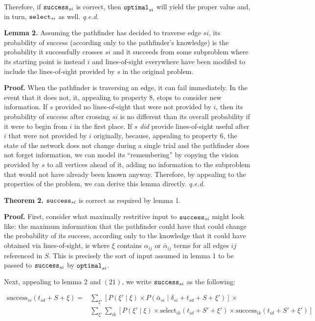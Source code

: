 \documentclass{article}
\begin{document}
Therefore, if ${\tt success}_{si}$ is correct, then ${\tt optimal}_{si}$
will yield the proper value and, in turn, ${\tt select}_{si}$ as well.
\emph{q.e.d.}

\textbf{Lemma 2.} Assuming the pathfinder has decided to traverse edge
$si$, its probability of success (according only to the pathfinder's
knowledge) is the probability it successfully crosses $si$ and it
succeeds from some subproblem where its starting point is instead $i$
and lines-of-sight everywhere have been modifed to include the
lines-of-sight provided by $s$ in the original problem.

\textbf{Proof.} When the pathfinder is traversing an edge, it can fail
immediately. In the event that it does not, it, appealing to property 8,
stops to consider new information. If $s$ provided no lines-of-sight
that were not provided by $i$, then its probability of success after
crossing $si$ is no different than its overall probability if it were to
begin from $i$ in the first place. If $s$ \emph{did} provide
lines-of-sight useful after $i$ that were not provided by $i$
originally, because, appealing to property 6, the state of the network
does not change during a single trial and the pathfinder does not forget
information, we can model its ``remembering'' by copying the vision
provided by $s$ to all vertices ahead of it, adding no information to
the subproblem that would not have already been known anyway. Therefore,
by appealing to the properties of the problem, we can derive this lemma
directly. \emph{q.e.d.}

\textbf{Theorem 2.} ${\tt success}_{si}$ is correct as required by lemma
1.

\textbf{Proof.} First, consider what maximally restritive input to
${\tt success}_{si}$ might look like: the maximum information that the
pathfinder could have that could change the probability of its success,
according only to the knowledge that it could have obtained via
lines-of-sight, is where $\xi$ contains $\alpha_{ij}$ or
$\bar \alpha_{ij}$ terms for all edges $ij$ referenced in $S$. This is
precisely the sort of input assumed in lemma 1 to be passed to
${\tt success}_{si}$ by ${\tt optimal}_{si}$.

Next, appealing to lemma 2 and $(21)$, we write ${\tt success}_{si}$ as
the following:

\begin{align}
    \text{success}_{si}(t_{sd} + S + \xi) =
        &\sum_{\xi'} \left[
            P(\xi' \mid \xi) \times P(\bar \alpha_{si} \mid \delta_{si} + t_{sd} + S + \xi')
        \right] \times \\
        &\sum_{\xi'} \sum_{ik} \left[
            P(\xi' \mid \xi) \times 
            \text{select}_{ik}(t_{id} + S' + \xi') \times
            \text{success}_{ik}(t_{id} + S' + \xi')
        \right]
\end{align}
\end{document}
